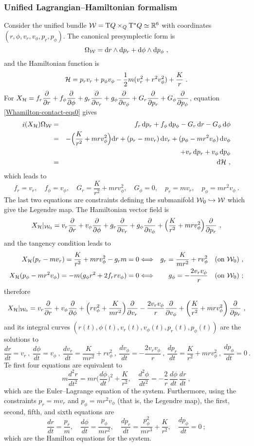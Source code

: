 \documentclass[12pt]{report}
\def\beann{\begin{eqnarray*}}
\def\eeann{\end{eqnarray*}}
\def\dst{\displaystyle}
\def\derpar#1#2{\frac{\partial{#1}}{\partial{#2}}}
\def\d{{\rm d}}
\def\Real{\mathbb{R}}
\def\Tan{{\rm T}}
\def\inn{\mathop{i}\nolimits}
\begin{document}
\subsubsection{Unified Lagrangian--Hamiltonian formalism}


Consider the unified bundle ${\cal W}=\Tan Q\times_Q\Tan^*Q\simeq\Real^6$
with coordinates $(r,\phi,v_r,v_\phi,p_r,p_\phi)$. 
The canonical presymplectic form is
$$
\Omega_{\cal W}=\d r \wedge\d p_r+\d\phi \wedge\d p_\phi \ ,
$$
and the Hamiltonian function is
$$
{\cal H}=p_rv_r+p_\phi v_\phi-\frac{1}{2}m(v_r^2+r^2v_\phi^2)+\frac{K}{r} \ .
$$
For $\displaystyle X_{\cal H}=f_r\derpar{}{r}+
f_\phi\derpar{}{\phi}+g_r\derpar{}{v_r}+g_\phi\derpar{}{v_\phi}+G_r\derpar{}{p_r}+G_\phi\derpar{}{p_\phi}$,
equation \eqref{Whamilton-contact-eqs0} gives
\beann
\inn(X_{\cal H})\Omega_{\cal W}&=&
 f_r\, \d p_r+f_\phi\, \d p_\phi-G_r\, \d r-G_\phi\, \d\phi
\\ &=&
-\Big(\frac{K}{r^2}+mrv_\phi^2\Big)\d r+(p_r-mv_r)\,\d v_r+(p_\phi-mr^2v_\phi)\,\d v_\phi\\
&&\quad + v_r\, \d p_r+v_\phi\, \d p_\phi
\\ &=& \d{\cal H}\ ,
\eeann
which leads to
$$
f_r=v_r  , \quad f_\phi=v_\phi , \quad
G_r=\frac{K}{r^2}+mrv_\phi^2  , \quad G_\phi=0 , \quad
p_r=mv_r  , \quad p_\phi=mr^2v_\phi \ .
$$
The last two equations are constraints defining the submanifold
${\cal W}_0\hookrightarrow{\cal W}$ which give the Legendre map.
The Hamiltonian vector field is
$$
X_{\cal H}\vert_{{\cal W}_0}=
v_r\derpar{}{r}+v_\phi\derpar{}{\phi}+g_r\derpar{}{v_r}+g_\phi\derpar{}{v_\phi}
+\Big(\frac{K}{r^2}+mrv_\phi^2\Big)\derpar{}{p_r} \ ,
$$
and the tangency condition leads to
\beann
X_{\cal H}(p_r-mv_r)=\frac{K}{r^2}+mrv_\phi^2-g_rm=0 &\Longleftrightarrow&
g_r=\frac{K}{mr^2}+rv_\phi^2 \quad \mbox{\rm (on ${\cal W}_0$)} \ , \\
X_{\cal H}(p_\phi-mr^2v_\phi)=-m(g_\phi r^2+2f_rrv_\phi)=0 &\Longleftrightarrow&
g_\phi=-\frac{2v_rv_\phi}{r} \quad \mbox{\rm (on ${\cal W}_0$)} \ ;
\eeann
therefore
$$
X_{\cal H}\vert_{{\cal W}_0}=
v_r\derpar{}{r}+v_\phi\derpar{}{\phi}+
\Big(rv_\phi^2+\dst\frac{K}{mr^2}\Big)\derpar{}{v_r}-\frac{2v_rv_\phi}{r}\derpar{}{v_\phi}
+\left(\frac{K}{r^2}+mrv_\phi^2\right)\derpar{}{p_r} \ ,
$$
and its integral curves $(r(t),\phi(t),v_r(t),v_\phi(t),p_r(t),p_\phi(t))$ are the solutions to
$$
\frac{dr}{dt}=v_r \ , \
\frac{d\phi}{dt}=v_\phi \ , \
\frac{dv_r}{dt}=\frac{K}{mr^2}+rv_\phi^2 \ , \
\frac{dv_\phi}{dt}=-\frac{2v_rv_\phi}{r} \ , \
\frac{dp_r}{dt}=\frac{K}{r^2}+mrv_\phi^2 \ , \
\frac{dp_\phi}{dt}=0 \ .
$$
Te first four equations are equivalent to
$$
m\frac{d^2r}{dt^2}=mr\Big(\frac{d\phi}{dt}\Big)^2+\frac{K}{r^2}  ,\quad
 \frac{d^2\phi}{dt^2}=
-\frac{2}{r}\,\frac{d\phi}{dt}\,\frac{dr}{dt}\ ,
$$
which are the Euler--Lagrange equation of the system. 
Furthermore, using the constraints $p_r=mv_r$ 
and $p_\phi=mr^2v_\phi$ (that is, the Legendre map),
the first, second, fifth, and sixth equations are
$$
\frac{dr}{dt}=\frac{p_r}{m} ,\quad
\frac{d\phi}{dt}=\frac{p_\phi}{mr^2} ,\quad
\frac{dp_r}{dt}=\frac{p_\phi^2}{mr^3}+\frac{K}{r^2}  ,\quad
\frac{dp_\phi}{dt}=0 \ ;
$$
which are the Hamilton equations for the system.
\end{document}
